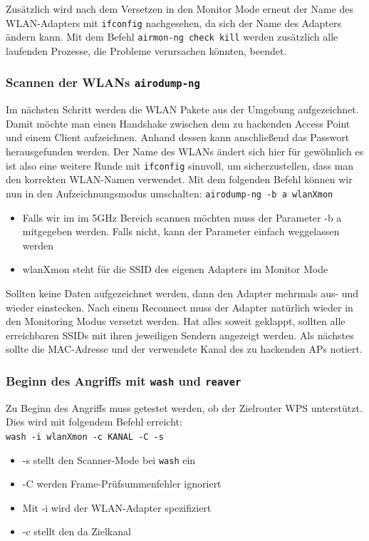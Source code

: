	Zusätzlich wird nach dem Versetzen in den Monitor Mode erneut der Name des WLAN-Adapters mit \colorbox{altgray}{\lstinline|ifconfig|} nachgesehen, da sich der Name des Adapters ändern kann. Mit dem Befehl \colorbox{altgray}{\lstinline|airmon-ng check kill|} werden zusätzlich alle laufenden Prozesse, die Probleme verursachen könnten, beendet.

	\subsubsection{Scannen der WLANs \colorbox{altgray}{\lstinline|airodump-ng|}}
	Im nächsten Schritt werden die WLAN Pakete aus der Umgebung aufgezeichnet. Damit möchte man einen Handshake zwischen dem zu hackenden Access Point und einem Client aufzeichnen. Anhand dessen kann anschließend das Passwort herausgefunden werden. Der Name des WLANs ändert sich hier für gewöhnlich es ist also eine weitere Runde mit \colorbox{altgray}{\lstinline|ifconfig|} sinnvoll, um sicherzustellen, dass man den korrekten WLAN-Namen verwendet. Mit dem folgenden Befehl können wir nun in den Aufzeichnungsmodus umschalten: \newline
	\colorbox{altgray}{\lstinline|airodump-ng -b a wlanXmon|}\newline
	\begin{itemize}
		\item Falls wir im im 5GHz Bereich scannen möchten muss der Parameter -b a mitgegeben werden. Falls nicht, kann der Parameter einfach weggelassen werden
		\item wlanXmon steht für die SSID des eigenen Adapters im Monitor Mode
	\end{itemize}

	 Sollten keine Daten aufgezeichnet werden, dann den Adapter mehrmals aus- und wieder einstecken. Nach einem Reconnect muss der Adapter natürlich wieder in den Monitoring Modus versetzt werden. Hat alles soweit geklappt, sollten alle erreichbaren SSIDs mit ihren jeweiligen Sendern angezeigt werden. Als nächstes sollte die MAC-Adresse und der verwendete Kanal des zu hackenden APs notiert.

	\subsubsection{Beginn des Angriffs mit \colorbox{altgray}{\lstinline|wash|} und \colorbox{altgray}{\lstinline|reaver|}}

	Zu Beginn des Angriffs muss getestet werden, ob der Zielrouter WPS unterstützt. Dies wird mit folgendem Befehl erreicht: \\
	\colorbox{altgray}{\lstinline|wash -i wlanXmon -c KANAL -C -s|}\newline
		\begin{itemize}
			\item -s stellt den Scanner-Mode bei \colorbox{altgray}{\lstinline|wash|} ein
			\item -C werden Frame-Prüfsummenfehler ignoriert
			\item Mit -i wird der WLAN-Adapter spezifiziert
			\item -c stellt den da Zielkanal
		\end{itemize}


